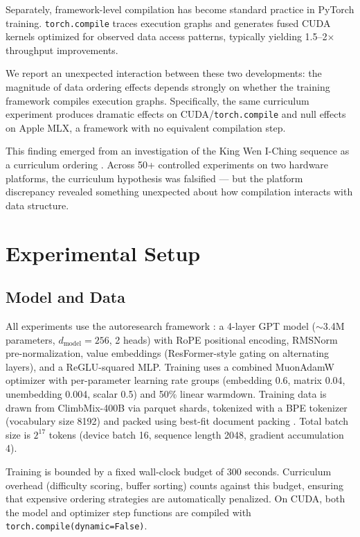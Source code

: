 \documentclass{article}
\begin{document}
Separately, framework-level compilation has become standard practice in
PyTorch training. \texttt{torch.compile} \cite{pytorch2compile} traces
execution graphs and generates fused CUDA kernels optimized for observed
data access patterns, typically yielding 1.5--2$\times$ throughput
improvements.

We report an unexpected interaction between these two developments:
the magnitude of data ordering effects depends strongly on whether
the training framework compiles execution graphs. Specifically, the
same curriculum experiment produces dramatic effects on
CUDA/\texttt{torch.compile} and null effects on Apple MLX, a framework
with no equivalent compilation step.

This finding emerged from an investigation of the King Wen I-Ching
sequence as a curriculum ordering \cite{chan2025kingwen}. Across 50+
controlled experiments on two hardware platforms, the curriculum
hypothesis was falsified --- but the platform discrepancy revealed
something unexpected about how compilation interacts with data structure.

\section{Experimental Setup}\label{sec:setup}

\subsection{Model and Data}

All experiments use the autoresearch framework \cite{karpathy2024autoresearch}:
a 4-layer GPT model ($\sim$3.4M parameters, $d_\text{model}=256$, 2 heads)
with RoPE positional encoding, RMSNorm pre-normalization, value embeddings
(ResFormer-style gating on alternating layers), and a ReGLU-squared MLP.
Training uses a combined MuonAdamW optimizer with per-parameter learning
rate groups (embedding 0.6, matrix 0.04, unembedding 0.004, scalar 0.5)
and 50\% linear warmdown. Training data is drawn from ClimbMix-400B via
parquet shards, tokenized with a BPE tokenizer (vocabulary size 8192)
and packed using best-fit document packing \cite{fewertruncations2024}.
Total batch size is $2^{17}$ tokens (device batch 16, sequence length 2048,
gradient accumulation 4).

Training is bounded by a fixed wall-clock budget of 300 seconds.
Curriculum overhead (difficulty scoring, buffer sorting) counts against
this budget, ensuring that expensive ordering strategies are
automatically penalized. On CUDA, both the model and optimizer step
functions are compiled with \texttt{torch.compile(dynamic=False)}.
\end{document}
